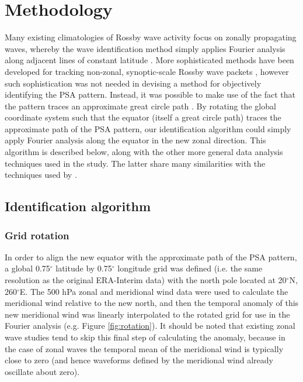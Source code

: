 \section{Methodology}

Many existing climatologies of Rossby wave activity focus on zonally propagating waves, whereby the wave identification method simply applies Fourier analysis along adjacent lines of constant latitude \citep[e.g.][]{Glatt2014,IrvingSimmonds2015}. More sophisticated methods have been developed for tracking non-zonal, synoptic-scale Rossby wave packets \citep[e.g.][]{Zimin2006,Souders2014}, however such sophistication was not needed in devising a method for objectively identifying the PSA pattern. Instead, it was possible to make use of the fact that the pattern traces an approximate great circle path \citep{Hoskins1981}. By rotating the global coordinate system such that the equator (itself a great circle path) traces the approximate path of the PSA pattern, our identification algorithm could simply apply Fourier analysis along the equator in the new zonal direction. This algorithm is described below, along with the other more general data analysis techniques used in the study. The latter share many similarities with the techniques used by \citet{IrvingSimmonds2015}.

\subsection{Identification algorithm}

\subsubsection{Grid rotation}

In order to align the new equator with the approximate path of the PSA pattern, a global 0.75$^{\circ}$ latitude by 0.75$^{\circ}$ longitude grid was defined (i.e. the same resolution as the original ERA-Interim data) with the north pole located at 20$^{\circ}$N, 260$^{\circ}$E. The 500 hPa zonal and meridional wind data were used to calculate the meridional wind relative to the new north, and then the temporal anomaly of this new meridional wind was linearly interpolated to the rotated grid for use in the Fourier analysis (e.g. Figure \ref{fig:rotation}). It should be noted that existing zonal wave studies \citep[e.g.][]{IrvingSimmonds2015} tend to skip this final step of calculating the anomaly, because in the case of zonal waves the temporal mean of the meridional wind is typically close to zero (and hence waveforms defined by the meridional wind already oscillate about zero). 

